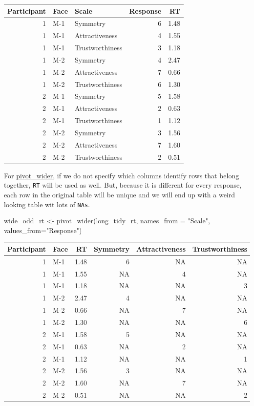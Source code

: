 \documentclass[
]{book}
\newenvironment{Shaded}{\begin{snugshade}}{\end{snugshade}}
\newcommand{\AttributeTok}[1]{\textcolor[rgb]{0.77,0.63,0.00}{#1}}
\newcommand{\FunctionTok}[1]{\textcolor[rgb]{0.00,0.00,0.00}{#1}}
\newcommand{\NormalTok}[1]{#1}
\newcommand{\OtherTok}[1]{\textcolor[rgb]{0.56,0.35,0.01}{#1}}
\newcommand{\StringTok}[1]{\textcolor[rgb]{0.31,0.60,0.02}{#1}}
\begin{document}
\begin{tabular}{r|l|l|r|r}
\hline
Participant & Face & Scale & Response & RT\\
\hline
1 & M-1 & Symmetry & 6 & 1.48\\
\hline
1 & M-1 & Attractiveness & 4 & 1.55\\
\hline
1 & M-1 & Trustworthiness & 3 & 1.18\\
\hline
1 & M-2 & Symmetry & 4 & 2.47\\
\hline
1 & M-2 & Attractiveness & 7 & 0.66\\
\hline
1 & M-2 & Trustworthiness & 6 & 1.30\\
\hline
2 & M-1 & Symmetry & 5 & 1.58\\
\hline
2 & M-1 & Attractiveness & 2 & 0.63\\
\hline
2 & M-1 & Trustworthiness & 1 & 1.12\\
\hline
2 & M-2 & Symmetry & 3 & 1.56\\
\hline
2 & M-2 & Attractiveness & 7 & 1.60\\
\hline
2 & M-2 & Trustworthiness & 2 & 0.51\\
\hline
\end{tabular}

For \href{https://tidyr.tidyverse.org/reference/pivot_wider.html}{pivot\_wider}, if we do not specify which columns identify rows that belong together, \texttt{RT} will be used as well. But, because it is different for every response, each row in the original table will be unique and we will end up with a weird looking table wit lots of \texttt{NAs}.

\begin{Shaded}
\begin{Highlighting}[]
\NormalTok{wide\_odd\_rt }\OtherTok{\textless{}{-}}
  \FunctionTok{pivot\_wider}\NormalTok{(long\_tidy\_rt, }\AttributeTok{names\_from =} \StringTok{"Scale"}\NormalTok{, }\AttributeTok{values\_from=}\StringTok{"Response"}\NormalTok{)}
\end{Highlighting}
\end{Shaded}

\begin{tabular}{r|l|r|r|r|r}
\hline
Participant & Face & RT & Symmetry & Attractiveness & Trustworthiness\\
\hline
1 & M-1 & 1.48 & 6 & NA & NA\\
\hline
1 & M-1 & 1.55 & NA & 4 & NA\\
\hline
1 & M-1 & 1.18 & NA & NA & 3\\
\hline
1 & M-2 & 2.47 & 4 & NA & NA\\
\hline
1 & M-2 & 0.66 & NA & 7 & NA\\
\hline
1 & M-2 & 1.30 & NA & NA & 6\\
\hline
2 & M-1 & 1.58 & 5 & NA & NA\\
\hline
2 & M-1 & 0.63 & NA & 2 & NA\\
\hline
2 & M-1 & 1.12 & NA & NA & 1\\
\hline
2 & M-2 & 1.56 & 3 & NA & NA\\
\hline
2 & M-2 & 1.60 & NA & 7 & NA\\
\hline
2 & M-2 & 0.51 & NA & NA & 2\\
\hline
\end{tabular}
\end{document}
